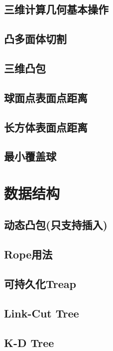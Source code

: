 \documentclass[10pt]{article}
\begin{document}
	\subsection{三维计算几何基本操作}

	\subsection{凸多面体切割}

	\subsection{三维凸包}

	\subsection{球面点表面点距离}
		
	\subsection{长方体表面点距离}

	\subsection{最小覆盖球}

\section{数据结构}
	\subsection{动态凸包(只支持插入)}
	
	\subsection{Rope用法}
	
	\subsection{可持久化Treap}
	
	\subsection{Link-Cut Tree}

	\subsection{K-D Tree}
\end{document}
